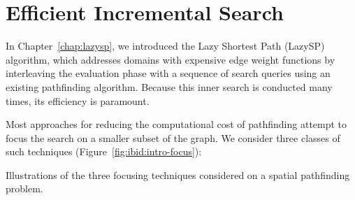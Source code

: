 \chapter{Efficient Incremental Search}
\label{chap:ibid}

In Chapter~\ref{chap:lazysp},
we introduced the Lazy Shortest Path (LazySP) algorithm,
which addresses domains with expensive edge weight functions
by interleaving the evaluation phase with a sequence of 
search queries using an existing pathfinding algorithm.
Because this inner search is conducted many times,
its efficiency is paramount.

Most approaches for reducing the computational cost of pathfinding
attempt to focus the search on a smaller subset of the graph.
We consider three classes of such techniques
(Figure~\ref{fig:ibid:intro-focus}):

\begin{marginfigure}[5cm]%
   \centering%
   
   
   
   \caption{Illustrations of the three focusing techniques considered
      on a spatial pathfinding problem.}%
   \label{fig:ibid:intro-focus}
\end{marginfigure}

